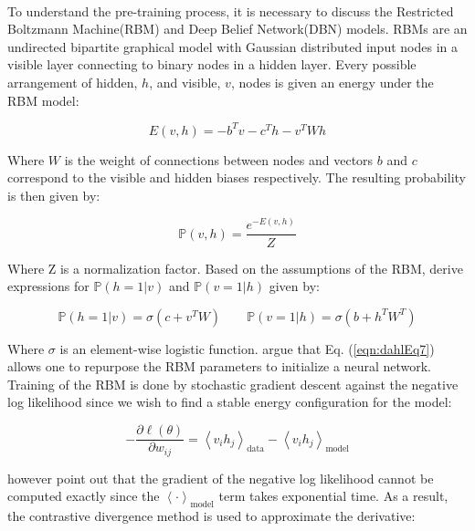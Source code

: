 \documentclass[letterpaper]{article}
\newcommand{\cprob}[2]{ \prob{#1 \lvert #2} }
\newcommand{\prob}[1]{\mathbb{P}\left( #1 \right)}
\newcommand{\partialDx}[2]{\frac{\partial #1}{ \partial #2  }}
\newcommand{\inAngle}[1]{\left \langle #1 \right \rangle}
\newcommand{\DBN}{Deep Belief Network\xspace}
\newcommand{\RBM}{Restricted Boltzmann Machine\xspace}
\begin{document}
\paragraph{} To understand the pre-training process, it is necessary to discuss the \RBM (RBM) and \DBN (DBN) models. RBMs are an undirected bipartite graphical model with Gaussian distributed input nodes in a visible layer connecting to binary nodes in a hidden layer. Every possible arrangement of hidden, $h$, and visible, $v$, nodes is given an energy under the RBM model: 

\begin{equation}
E(v, h) = - b^T v - c^T h - v^T W h
\end{equation}

Where $W$ is the weight of connections between nodes and vectors $b$ and $c$ correspond to the visible and hidden biases respectively. The resulting probability is then given by:

\begin{equation}
\prob{v, h} = \frac{e^{-E(v, h)}}{Z}
\end{equation}

Where Z is a normalization factor. Based on the assumptions of the RBM, \cite{DBLP:journals/taslp/DahlYDA12} derive expressions for $\cprob{h = 1}{v}$ and $\cprob{v = 1}{h}$ given by:

\begin{equation}
\cprob{h = 1}{v} = \sigma(c + v^T W) \qquad \cprob{v = 1}{h} = \sigma(b + h^T W^T)
\label{eqn:dahlEq7}
\end{equation}

Where $\sigma$ is an element-wise logistic function. \cite{DBLP:journals/taslp/DahlYDA12} argue that Eq. (\ref{eqn:dahlEq7}) allows one to repurpose the RBM parameters to initialize a neural network. Training of the RBM is done by stochastic gradient descent against the negative log likelihood since we wish to find a stable energy configuration for the model:

\begin{equation}
	- \partialDx{\ell(\theta)}{w_{ij}} = \inAngle{ v_i h_j }_\text{data} - \inAngle{ v_i h_j }_\text{model}
\end{equation}

however \cite{DBLP:journals/taslp/DahlYDA12} point out that the gradient of the negative log likelihood cannot be computed exactly since the $\inAngle{ \cdot }_\text{model}$ term takes exponential time. As a result, the contrastive divergence method is used to approximate the derivative:
\end{document}
